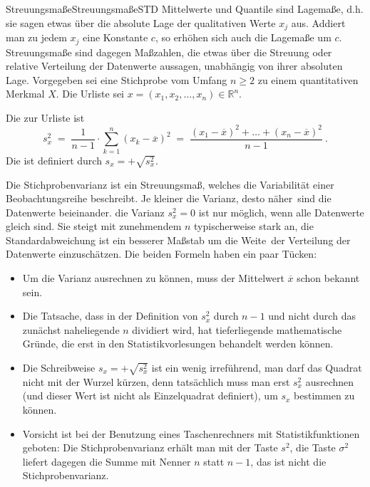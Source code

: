 \begin{MXContent}{Streuungsmaße}{Streuungsmaße}{STD}
Mittelwerte und Quantile sind Lagemaße, d.h. sie sagen etwas über die absolute Lage der qualitativen Werte $x_j$ aus. Addiert man zu jedem $x_j$ eine Konstante $c$,
so erhöhen sich auch die Lagemaße um $c$. Streuungsmaße sind dagegen Maßzahlen, die etwas über die Streuung oder relative Verteilung der Datenwerte aussagen,
unabhängig von ihrer absoluten Lage. Vorgegeben sei eine Stichprobe vom Umfang $n\geq 2$ zu einem quantitativen Merkmal $X$.
Die Urliste sei $x=(x_{1},x_{2},\ldots ,x_{n})\in \mathbb{R}^{n}$.

\begin{MInfo}
Die  zur Urliste ist
$$
s_{x}^{2}\;=\; \frac{1}{n-1}\cdot \sum\limits_{k=1}^{n}(x_{k}-\overline{x})^{2}\; =\; \frac{(x_{1}-\overline{x})^{2}+ \ldots +(x_{n}-\overline{x})^{2}}{n-1}\: .
$$
Die  ist definiert durch $s_{x}=+\sqrt{s_{x}^{2}}$.
\end{MInfo}

Die Stichprobenvarianz ist ein Streuungsmaß, welches die Variabilität einer Beobachtungsreihe beschreibt. Je kleiner die Varianz, desto \glqq näher\grqq\ sind die Datenwerte beieinander.
die Varianz $s_x^2=0$ ist nur möglich, wenn alle Datenwerte gleich sind. Sie steigt mit zunehmendem $n$ typischerweise stark an, die Standardabweichung ist ein besserer Maßstab um
die \glqq Weite\grqq\ der Verteilung der Datenwerte einzuschätzen. Die beiden Formeln haben ein paar Tücken:
\begin{itemize}
\item{Um die Varianz ausrechnen zu können, muss der Mittelwert $\overline{x}$ schon bekannt sein.}
\item{Die Tatsache, dass in der Definition von $s_{x}^{2}$ durch $n-1$ und nicht durch das zunächst naheliegende $n$ dividiert wird, hat tieferliegende mathematische Gründe,
die erst in den Statistikvorlesungen behandelt werden können.}
\item{Die Schreibweise $s_{x}=+\sqrt{s_{x}^{2}}$ ist ein wenig irreführend, man darf das Quadrat nicht mit der Wurzel kürzen, denn tatsächlich muss man erst $s^2_x$ ausrechnen (und dieser Wert ist
nicht als Einzelquadrat definiert), um $s_x$ bestimmen zu können.}
\item{Vorsicht ist bei der Benutzung eines Taschenrechners mit Statistikfunktionen geboten: Die Stichprobenvarianz erhält man mit der Taste $s^2$, die Taste $\sigma^2$ liefert dagegen
die Summe mit Nenner $n$ statt $n-1$, das ist nicht die Stichprobenvarianz.}
\end{itemize}


\end{MXContent}
